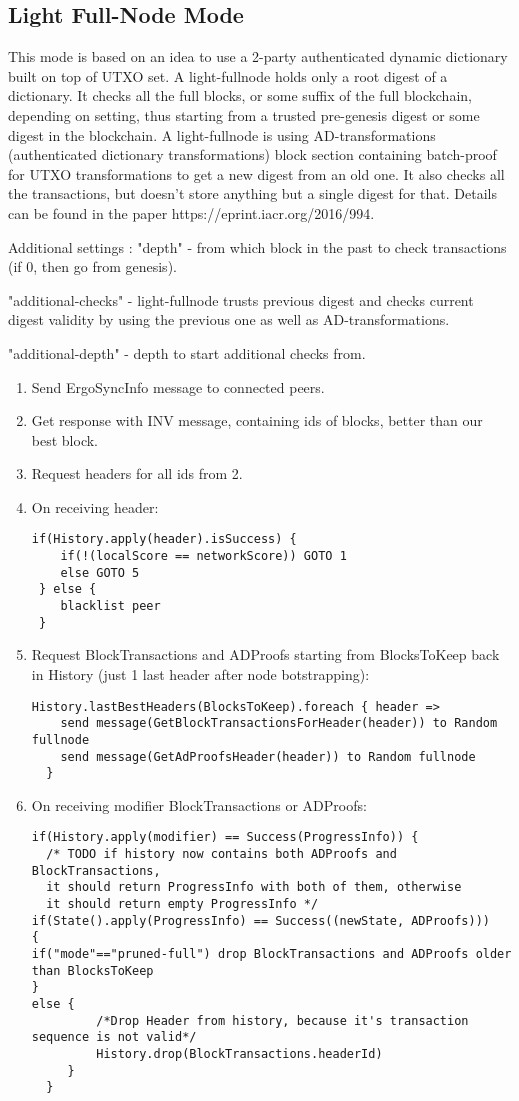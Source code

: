 \documentclass[]{article}   %
\begin{document}
\subsection{Light Full-Node Mode}
This mode is based on an idea to use a 2-party authenticated dynamic dictionary built on top of UTXO set. A light-fullnode holds only a root digest of a dictionary. It checks all the full blocks, or some suffix of the full blockchain, depending on setting, thus starting from a trusted pre-genesis digest or some digest in the blockchain. A light-fullnode is using AD-transformations (authenticated dictionary transformations) block section containing batch-proof for UTXO transformations to get a new digest from an old one. It also checks all the transactions, but doesn’t store anything but a single digest for that. Details can be found in the paper https://eprint.iacr.org/2016/994. \par
Additional settings : "depth" - from which block in the past to check transactions (if 0, then go from genesis). \par
"additional-checks" - light-fullnode trusts previous digest and checks current digest validity by using the previous one as well as AD-transformations. \par
"additional-depth" - depth to start additional checks from.
\begin{enumerate}
\item Send ErgoSyncInfo message to connected peers.
\item Get response with INV message, containing ids of blocks, better than our best block.
\item Request headers for all ids from 2.
\item On receiving header:
\begin{verbatim}
if(History.apply(header).isSuccess) {
    if(!(localScore == networkScore)) GOTO 1
    else GOTO 5
 } else {
    blacklist peer
 }
\end{verbatim}
\item Request BlockTransactions and ADProofs starting from BlocksToKeep back in History (just 1 last header after node botstrapping):
\begin{verbatim}
History.lastBestHeaders(BlocksToKeep).foreach { header => 
    send message(GetBlockTransactionsForHeader(header)) to Random fullnode
    send message(GetAdProofsHeader(header)) to Random fullnode
  }
\end{verbatim}
\item On receiving modifier BlockTransactions or ADProofs:
\begin{verbatim}
if(History.apply(modifier) == Success(ProgressInfo)) {
  /* TODO if history now contains both ADProofs and BlockTransactions,
  it should return ProgressInfo with both of them, otherwise
  it should return empty ProgressInfo */
if(State().apply(ProgressInfo) == Success((newState, ADProofs)))
{
if("mode"=="pruned-full") drop BlockTransactions and ADProofs older than BlocksToKeep
} 
else {
         /*Drop Header from history, because it's transaction sequence is not valid*/
         History.drop(BlockTransactions.headerId)
     }
  }
\end{verbatim}
\end{enumerate}
\end{document}
